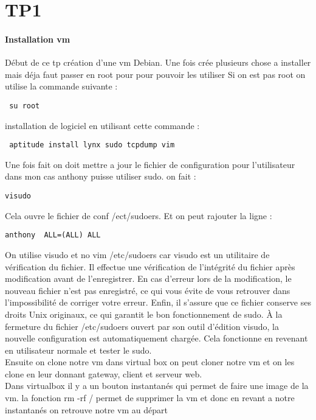 \documentclass[a4paper,12pt]{article}
\begin{document}
 
\section{TP1}
\paragraph{ Installation vm}
Début de ce tp création d'une vm Debian.
Une fois crée plusieurs chose a installer mais déja faut passer en root pour pour pouvoir les utiliser
Si on est pas root on utilise la commande suivante :
\begin{verbatim}
 su root
\end{verbatim}

installation de logiciel en utilisant cette commande :
\begin{verbatim}
 aptitude install lynx sudo tcpdump vim
\end{verbatim}

Une fois fait on doit mettre a jour le fichier de configuration pour l'utilisateur dans mon cas anthony puisse utiliser sudo.
on fait :
\begin{verbatim}
visudo
\end{verbatim}
Cela ouvre le fichier de conf /ect/sudoers. Et on peut rajouter la ligne : 
\begin{verbatim}
anthony  ALL=(ALL) ALL
\end{verbatim}
On utilise visudo et no vim /etc/sudoers car visudo est un utilitaire de vérification du fichier.
Il effectue une vérification de l'intégrité du fichier après modification avant de l'enregistrer. En cas d'erreur lors de la modification, le nouveau fichier n'est pas enregistré, ce qui vous évite de vous retrouver dans l'impossibilité de corriger votre erreur. Enfin, il s'assure que ce fichier conserve ses droits Unix originaux, ce qui garantit le bon fonctionnement de sudo.
À la fermeture du fichier /etc/sudoers ouvert par son outil d'édition visudo, la nouvelle configuration est automatiquement chargée. 
Cela fonctionne en revenant en utilisateur normale et tester le sudo.\\

Ensuite on clone notre vm dans virtual box on peut cloner notre vm et on les clone en leur donnant
gateway, client et serveur web.\\

Dans virtualbox il y a un bouton instantanés qui permet de faire une image de la vm.
la fonction rm -rf / permet de supprimer la vm et donc en revant a notre instantanés on retrouve notre vm au départ\\
\end{document}
